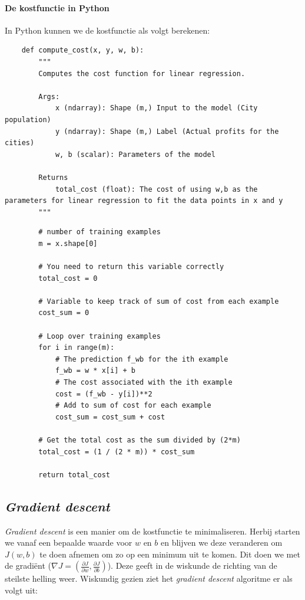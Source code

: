 \paragraph{De kostfunctie in Python}
In Python kunnen we de kostfunctie als volgt berekenen:

\begin{lstlisting}
	def compute_cost(x, y, w, b): 
	    """
	    Computes the cost function for linear regression.
	
	    Args:
	        x (ndarray): Shape (m,) Input to the model (City population) 
	        y (ndarray): Shape (m,) Label (Actual profits for the cities)
	        w, b (scalar): Parameters of the model
	        
	    Returns
	        total_cost (float): The cost of using w,b as the parameters for linear regression to fit the data points in x and y
	    """
\end{lstlisting}
\begin{lstlisting}
	    # number of training examples
	    m = x.shape[0] 
	
	    # You need to return this variable correctly
	    total_cost = 0
	
	    # Variable to keep track of sum of cost from each example
	    cost_sum = 0
	
	    # Loop over training examples
	    for i in range(m):
	        # The prediction f_wb for the ith example
	        f_wb = w * x[i] + b
	        # The cost associated with the ith example
	        cost = (f_wb - y[i])**2
	        # Add to sum of cost for each example
	        cost_sum = cost_sum + cost 
	        
	    # Get the total cost as the sum divided by (2*m)
	    total_cost = (1 / (2 * m)) * cost_sum
	
	    return total_cost
\end{lstlisting}

\subsection{\textit{Gradient descent}}

\textit{Gradient descent} is een manier om de kostfunctie te minimaliseren. Herbij starten we vanaf een bepaalde waarde voor $w$ en $b$ en blijven we deze veranderen om $J(w, b)$ te doen afnemen om zo op een minimum uit te komen. Dit doen we met de gradiënt ($\nabla J = (\frac{\partial J}{\partial w}, \frac{\partial J}{\partial b})$). Deze geeft in de wiskunde de richting van de steilste helling weer. Wiskundig gezien ziet het \textit{gradient descent} algoritme er als volgt uit:


